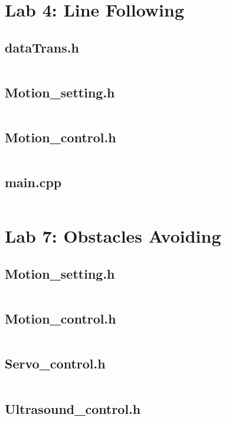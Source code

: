 \documentclass[../main]{subfiles}
\begin{document}
\section{Lab 4: Line Following}

\subsection{dataTrans.h}
\inputminted{cpp}{src/5-line/dataTrans.h}

\subsection{Motion\_setting.h}
\inputminted{cpp}{src/5-line/motion_setting.h}

\subsection{Motion\_control.h}
\inputminted{cpp}{src/5-line/motion_control.h}

\subsection{main.cpp}
\inputminted{cpp}{src/5-line/main.cpp}

\section{Lab 7: Obstacles Avoiding}

\subsection{Motion\_setting.h}
\inputminted{cpp}{src/7-obstacles/motion_setting.h}

\subsection{Motion\_control.h}
\inputminted{cpp}{src/7-obstacles/motion_control.h}

\subsection{Servo\_control.h}
\inputminted{cpp}{src/7-obstacles/servo_control.h}

\subsection{Ultrasound\_control.h}
\inputminted{cpp}{src/7-obstacles/ultrasound_control.h}
\end{document}
